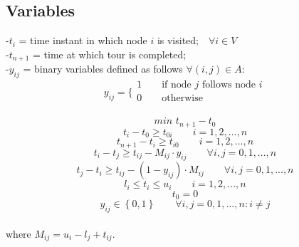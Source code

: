 \documentclass[a4paper,12pt,titlepage]{article}
\begin{document}
\subsection*{Variables}
-$t_i$ = 
time instant in which node $i$ is visited;\,\,\,\ $\forall i\in V$\\
-$t_{n+1}$ =  time at which tour is completed;\\
-$y_{ij}$ = binary variables defined as follows $\forall (i,j)\in A$:
$$y_{ij}=
\bigg \{
\begin{array}{ll}
1\qquad \text{if node $j$ follows node $i$}\\
0\qquad \text{otherwise}\\
\end{array}
$$

\newpage

\begin{equation}
	min\,\,t_{n+1}-t_0 
	\tag{1}
\end{equation}
\begin{equation}
	t_i-t_0 \geq t_{0i} \qquad i=1,2,...,n
	\tag{2}
\end{equation}
\begin{equation}
	t_{n+1}-t_i \geq t_{i0} \qquad i=1,2,...,n 
	\tag{3}
\end{equation}
\begin{equation}
	t_i-t_{j}\geq t_{ij}- M_{ij}\cdot y_{ij}  \qquad \forall i,j=0,1,...,n
	\tag{4}
\end{equation}
\begin{equation}
	t_j-t_{i}\geq t_{ij}- (1-y_{ij})\cdot M_{ij} \qquad \forall i,j=0,1,...,n
	\tag{5}
\end{equation}
\begin{equation}
	l_i\leq t_i \leq u_i \qquad i=1,2,...,n
	\tag{6}
\end{equation}
\begin{equation}
	t_0=0
	\tag{7}
\end{equation}
\begin{equation}
	y_{ij} \in \left\lbrace 0,1\right\rbrace \qquad \forall i,j=0,1,...,n: i\neq j
	\tag{8}
\end{equation}
\\
where $ M_{ij} = u_i - l_j + t_{ij}$.
\end{document}
